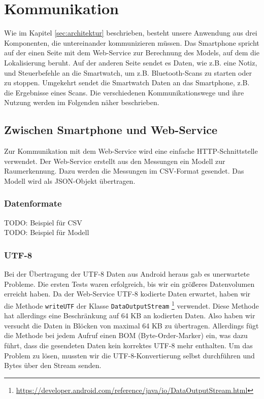 \section{Kommunikation}
Wie im Kapitel \ref{sec:architektur} beschrieben, besteht unsere Anwendung aus drei Komponenten, die untereinander kommunizieren müssen. Das Smartphone spricht auf der einen Seite mit dem Web-Service zur Berechnung des Models, auf dem die Lokalisierung beruht. Auf der anderen Seite sendet es Daten, wie z.B. eine Notiz, und Steuerbefehle an die Smartwatch, um z.B. Bluetooth-Scans zu starten oder zu stoppen. Umgekehrt sendet die Smartwatch Daten an das Smartphone, z.B. die Ergebnisse eines Scans. Die verschiedenen Kommunikationswege und ihre Nutzung werden im Folgenden näher beschrieben.

\subsection{Zwischen Smartphone und Web-Service}

Zur Kommunikation mit dem Web-Service wird eine einfache HTTP-Schnittstelle verwendet.
Der Web-Service erstellt aus den Messungen ein Modell zur Raumerkennung. Dazu
werden die Messungen im CSV-Format gesendet. Das Modell wird als JSON-Objekt
übertragen.

\subsubsection{Datenformate}
TODO: Beispiel für CSV \\
TODO: Beispiel für Modell


\subsubsection{UTF-8}
Bei der Übertragung der UTF-8 Daten aus Android heraus gab es unerwartete Probleme.
Die ersten Tests waren erfolgreich, bis wir ein größeres Datenvolumen erreicht haben.
Da der Web-Service UTF-8 kodierte Daten erwartet, haben wir die Methode \texttt{writeUTF}
der Klasse \texttt{DataOutputStream}
\footnote{\url{https://developer.android.com/reference/java/io/DataOutputStream.html}} 
verwendet. Diese Methode hat allerdings eine Beschränkung auf 64 KB an kodierten Daten.
Also haben wir versucht die Daten in Blöcken von maximal 64 KB zu übertragen. Allerdings
fügt die Methode bei jedem Aufruf einen BOM (Byte-Order-Marker) ein, was dazu führt,
dass die gesendeten Daten kein korrektes UTF-8 mehr enthalten.
Um das Problem zu lösen, mussten wir die UTF-8-Konvertierung selbst durchführen
und Bytes über den Stream senden.

